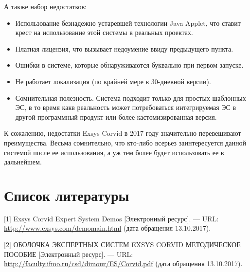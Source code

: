 \documentclass[14pt,a4paper,report]{report}
\begin{document}
А также набор недостатков:

\begin{itemize}
	\item Использование безнадежно устаревшей технологии Java Applet, что ставит крест на использование этой системы в реальных проектах.
	\item Платная лицензия, что вызывает недоумение ввиду предыдущего пункта.
	\item Ошибки в системе, которые обнаруживаются буквально при первом запуске.
	\item Не работает локализация (по крайней мере в 30-дневной версии).
	\item Сомнительная полезность. Система подходит только для простых шаблонных ЭС, в то время какв реальность может потребоваться интегрируемая ЭС в другой программный продукт или более кастомизированная версия.
\end{itemize}

К сожалению, недостатки Exsys Corvid в 2017 году значительно перевешивают преимущества. Весьма сомнительно, что кто-либо всерьез заинтересуется данной системой после ее использования, а уж тем более будет использовать ее в дальнейшем.

\section{Список литературы}


\begin{flushleft}
	
[1] Exsys Corvid Expert System Demos [Электронный ресурс]. — URL: \href{http://www.exsys.com/demomain.html}{http://www.exsys.com/demomain.html} (дата обращения 13.10.2017). \linebreak

[2] ОБОЛОЧКА ЭКСПЕРТНЫХ СИСТЕМ EXSYS CORVID МЕТОДИЧЕСКОЕ ПОСОБИЕ [Электронный ресурс]. — URL: \href{http://faculty.ifmo.ru/csd/dimour/ES/Corvid.pdf}{http://faculty.ifmo.ru/csd/dimour/ES/Corvid.pdf} (дата обращения 13.10.2017). \linebreak

\end{flushleft}
	
\end{document}
